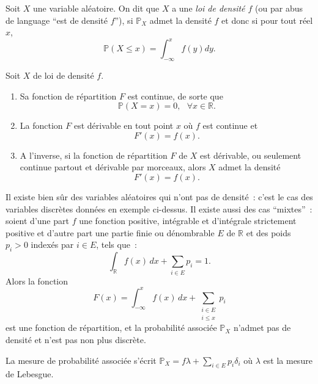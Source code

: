 \begin{definition}\label{I-va.densituxe9}

Soit \(X\) une variable aléatoire. On dit que \(X\) a une \emph{loi de
densité \(f\)} (ou par abus de language ``est de densité \(f\)''), si
\(\mathbb{P}_X\) admet la densité \(f\) et donc si pour tout réel \(x\),
\[ \mathbb{P}(X\leq x) = \int_{-\infty}^x f(y) dy.\]
\end{definition}

\begin{proposition}\label{I-fdr-va-dens}

Soit \(X\) de loi de densité \(f\).

\begin{enumerate}
\def\labelenumi{\arabic{enumi}.}
\tightlist
\item
  Sa fonction de répartition \(F\) est continue, de sorte que
  \[\mathbb{P}(X=x) = 0,~~~\forall x \in \mathbb{R}.\]
\item
  La fonction \(F\) est dérivable en tout point \(x\) où \(f\) est
  continue et \[F'(x) = f(x).\]
\item
  A l'inverse, si la fonction de répartition \(F\) de \(X\) est
  dérivable, ou seulement continue partout et dérivable par morceaux,
  alors \(X\) admet la densité \[F'(x) = f(x).\]
\end{enumerate}
\end{proposition}

Il existe bien sûr des variables aléatoires qui n'ont pas de densité~:
c'est le cas des variables discrètes données en exemple
\protect\hypertarget{I-ex.discret}{}{ci-dessus}. Il existe aussi des cas
``mixtes''~: soient d'une part \(f\) une fonction positive, intégrable
et d'intégrale strictement positive et d'autre part une partie finie ou
dénombrable \(E\) de \(\mathbb{R}\) et des poids \(p_i>0\) indexés par
\(i \in E\), tels que~:
\[ \int_\mathbb{R}f(x)\, dx + \sum_{i\in E} p_i = 1.\] Alors la fonction
\[ F(x) = \int_{-\infty}^x f(x)\, dx + \sum_{\substack{i\in E \\ i \leq x}} p_i\]
est une fonction de répartition, et la probabilité associée
\(\mathbb{P}_X\) n'admet pas de densité et n'est pas non plus discrète.

La mesure de probabilité associée s'écrit
\(\mathbb{P}_X = f\lambda + \sum_{i\in E} p_i \delta_i\) où \(\lambda\)
est la mesure de Lebesgue.

